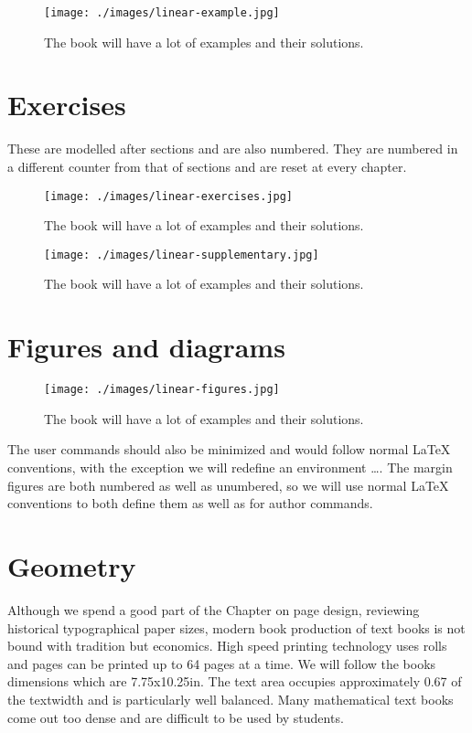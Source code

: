\begin{figure}[htbp]
\texttt{[image: ./images/linear-example.jpg]}
\caption{The book will have a lot of examples and their solutions. }
\end{figure}

\section{Exercises}

These are modelled after sections and are also numbered. They are numbered in a different counter from that of sections and are reset at every chapter. 

\begin{figure}[htbp]
\texttt{[image: ./images/linear-exercises.jpg]}
\caption{The book will have a lot of examples and their solutions. }
\end{figure}

\begin{figure}[htbp]
\texttt{[image: ./images/linear-supplementary.jpg]}
\caption{The book will have a lot of examples and their solutions. }
\end{figure}

\section{Figures and diagrams}

\begin{figure}[htbp]
\texttt{[image: ./images/linear-figures.jpg]}
\caption{The book will have a lot of examples and their solutions. }
\end{figure}

The user commands should also be minimized and would follow normal LaTeX conventions, with the exception we will redefine an environment \cmd{\begin}\ldots. The margin figures are both numbered as well as unumbered, so we will use normal LaTeX conventions to both define them as well as for author commands. 



\section{Geometry}

Although we spend a good part of the Chapter on page design, reviewing historical typographical paper sizes, modern book production of text books is not bound with tradition but economics. High speed printing technology uses rolls and pages can be printed up to 64 pages at a time. We will follow the books dimensions which are 7.75x10.25in. The text area occupies approximately 0.67 of the textwidth and is particularly well balanced. Many mathematical text books come out too dense and are difficult to be used by students. 






